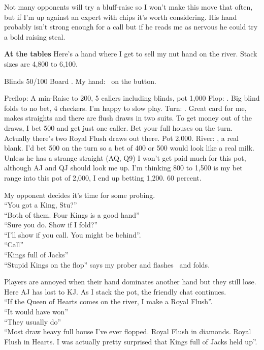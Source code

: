 Not many opponents will try a bluff-raise so I won't make this move
that often, but if I'm up against an expert with chips it's worth
considering. His hand probably isn't strong enough for a call but if he
reads me as nervous he could try a bold raising steal.

\textbf{At the tables} Here's a hand where I get to sell my nut hand
on the river. Stack sizes are 4,800 to 6,100.

Blinds 50/100 Board \Kd\Kh\Jd\tenh\tres. My hand: \Kc\Jc\ on the button.

Preflop: A min-Raise to 200, 5 callers including blinds, pot 1,000
Flop: \Kd\Kh\Jd. Big blind folds to no bet, 4 checkers. I'm happy to slow play.
Turn: \tenh. Great card for me, makes straights and there are flush
  draws in two suits. To get money out of the draws, I bet 500 and get
  just one caller. Bet your full houses on the turn. Actually there's
  two Royal Flush draws out there. Pot 2,000.
River: \tres, a real blank. I'd bet 500 on the turn so a bet of 400 or
  500 would look like a real milk. Unless he has a strange straight
  (AQ, Q9) I won't get paid much for this pot, although AJ and QJ should
  look me up. I'm thinking 800 to 1,500 is my bet range into this pot
  of 2,000, I end up betting 1,200. 60 percent.

My opponent decides it's time for some probing.\\
``You got a King, Stu?'' \\
``Both of them. Four Kings is a good hand'' \\
``Sure you do. Show if I fold?'' \\
``I'll show if you call. You might be behind''. \\
``Call'' \\
``Kings full of Jacks'' \\
``Stupid Kings on the flop'' says my prober and flashes \Ah\Jh\ and folds.


Players are annoyed when their hand dominates another hand but they
still lose. Here AJ has lost to KJ. As I stack the pot, the friendly
chat continues. \\
``If the Queen of Hearts comes on the river, I make a Royal Flush''. \\
``It would have won'' \\
``They usually do'' \\
``Most draw heavy full house I've ever flopped. Royal Flush in diamonds.
Royal Flush in Hearts. I was actually pretty surprised that Kings
full of Jacks held up''.

